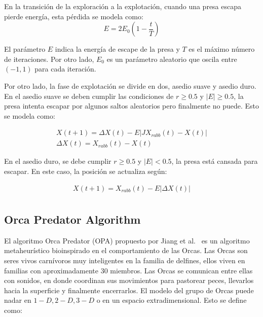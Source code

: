 \documentclass[conference]{IEEEtran}
\begin{document}
\noindent En la transición de la exploración a la explotación, cuando una presa escapa pierde energía, esta pérdida se modela como:
\begin{equation}
E = 2 E_0 (1 - \frac{t}{T}) 
\label{eq15}
\end{equation}

\noindent El parámetro $E$ indica la energía de escape de la presa y $T$ es el máximo número de iteraciones. Por otro lado, $E_0$ es un parámetro aleatorio que oscila entre $(-1,1)$ para cada iteración.

\noindent Por otro lado, la fase de explotación se divide en dos, asedio suave y asedio duro. En el asedio suave se deben cumplir las condiciones de $r \geq 0.5$ y $|E| \geq 0.5$, la presa intenta escapar por algunos saltos aleatorios pero finalmente no puede. Esto se modela como:

\begin{equation}
\begin{gathered}
X(t+1) = \Delta X(t) - E |J X_{rabb}(t) -X(t)| \\
\Delta X(t) = X_{rabb}(t) - X(t)
\end{gathered}
\label{eq16}
\end{equation}

\noindent En el asedio duro, se debe cumplir $r \geq 0.5$ y $|E| < 0.5$, la presa está cansada para escapar. En este caso, la posición se actualiza según:

\begin{equation}
\begin{gathered}
X(t+1) = X_{rabb}(t) - E |\Delta X(t)| \\
\end{gathered}
\label{eq17}
\end{equation}

\subsection{Orca Predator Algorithm}

\noindent El algoritmo Orca Predator (OPA) propuesto por Jiang et al.~\cite{Jiang2022} es un algoritmo metaheurístico bioinspirado en el comportamiento de las Orcas. Las Orcas son seres vivos carnívoros muy inteligentes en la familia de delfines, ellos viven en familias con aproximadamente 30 miembros. Las Orcas se comunican entre ellas con sonidos, en donde coordinan sus movimientos para pastorear peces, llevarlos hacia la superficie y finalmente encerrarlos. El modelo del grupo de Orcas puede nadar en $1-D, 2-D, 3-D$ o en un espacio extradimensional. Esto se define como:
\end{document}
